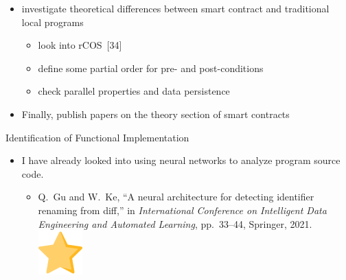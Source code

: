 \documentclass[xcolor=svgnames]{beamer}
\begin{document}
\begin{frame}[t]
\begin{itemize}
\item<5-> investigate theoretical differences between smart contract and traditional local programs
	\begin{itemize}
	\item look into rCOS~[34]
	\item define some partial order for pre- and post-conditions
	\item check parallel properties and data persistence
	\end{itemize}
\item<6-> Finally, publish papers on the theory section of smart contracts
\end{itemize}
\end{frame}


\begin{frame}[t]{Identification of Functional Implementation}
\begin{itemize}
\item I have already looked into using neural networks to analyze program source code.
	\begin{itemize}
	\item Q.~Gu and W.~Ke, ``A neural architecture for detecting identifier renaming from diff,'' in {\em International Conference on Intelligent Data Engineering and Automated Learning}, pp.~33--44, Springer, 2021.~\includegraphics[height=2ex, angle=20,origin=c, ]{favourite.png}
	\end{itemize}


\end{itemize}
\end{frame}
\end{document}
